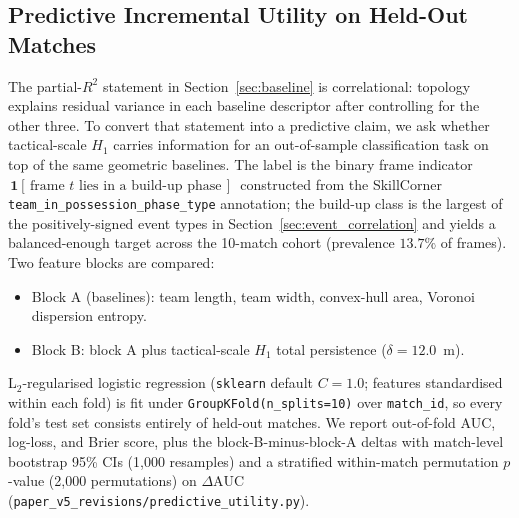 \subsection{Predictive Incremental Utility on Held-Out Matches}
\label{sec:predictive}

The partial-\(R^2\) statement in Section~\ref{sec:baseline} is correlational: topology explains residual variance in each baseline descriptor after controlling for the other three. To convert that statement into a predictive claim, we ask whether tactical-scale \(H_1\) carries information for an out-of-sample classification task on top of the same geometric baselines. The label is the binary frame indicator
\(\,\mathbf{1}[\,\text{frame }t\text{ lies in a build-up phase}\,]\,\)
constructed from the SkillCorner \texttt{team\_in\_possession\_phase\_type} annotation; the build-up class is the largest of the positively-signed event types in Section~\ref{sec:event_correlation} and yields a balanced-enough target across the 10-match cohort (prevalence \(13.7\%\) of frames). Two feature blocks are compared:

\begin{itemize}
  \item Block A (baselines): team length, team width, convex-hull area, Voronoi dispersion entropy.
  \item Block B: block A plus tactical-scale \(H_1\) total persistence (\(\delta=12.0\)~m).
\end{itemize}

L\(_2\)-regularised logistic regression (\texttt{sklearn} default \(C=1.0\); features standardised within each fold) is fit under \texttt{GroupKFold(n\_splits=10)} over \texttt{match\_id}, so every fold's test set consists entirely of held-out matches. We report out-of-fold AUC, log-loss, and Brier score, plus the block-B-minus-block-A deltas with match-level bootstrap 95\% CIs (1{,}000 resamples) and a stratified within-match permutation \(p\)-value (2{,}000 permutations) on \(\Delta\text{AUC}\) (\texttt{paper\_v5\_revisions/predictive\_utility.py}).


